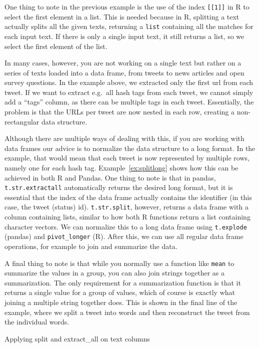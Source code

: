 One thing to note in the previous example is the use of the index \verb|[[1]]| in R to select the first element in a list.
This is needed because in R, splitting a text actually splits all the given texts, returning a \texttt{list} containing all the matches for each input text.
If there is only a single input text, it still returns a list, so we select the first element of the list.

In many cases, however, you are not working on a single text but rather on a series of texts loaded into a data frame,
from tweets to news articles and open survey questions.
In the example above, we extracted only the first url from each tweet.
If we  want to extract e.g.\ all hash tags from each tweet, we cannot simply add a ``tags'' column,
as there can be multiple tags in each tweet.
Essentially, the problem is that the URLs per tweet are now nested in each row,
creating a non-rectangular data structure.

Although there are multiple ways of dealing with this,
if you are working with data frames our advice is to normalize the data structure to a long format.
In the example, that would mean that each tweet is now represented by multiple rows,
namely one for each hash tag.
Example~\ref{ex:splitlong} shows how this can be achieved in both R and Pandas.
One thing to note is that in pandas,
\verb|t.str.extractall| automatically returns the desired long format,
but it is essential that the index of the data frame actually contains the identifier (in this case, the tweet (status) id).
\verb|t.str.split|, however, returns a data frame with a column containing lists,
similar to how both R functions return a list containing character vectors.
We can normalize this to a long data frame using \texttt{t.explode} (pandas) and \texttt{pivot\_longer} (R).
After this, we can use all regular data frame operations, for example to join and summarize the data.

A final thing to note is that  while you normally use a function like \texttt{mean} to summarize the values in a group,
you can also join strings together as a summarization.
The only requirement for a summarization function is that it returns a single value for a group of values,
which of course is exactly what joining a multiple string together does.
This is shown in the final line of the example, where we split a tweet into words and then reconstruct the tweet from the individual words.



\begin{ccsexample}
  \caption{Applying split and extract\_all on text columns}\label{ex:splitlong}
\end{ccsexample}




